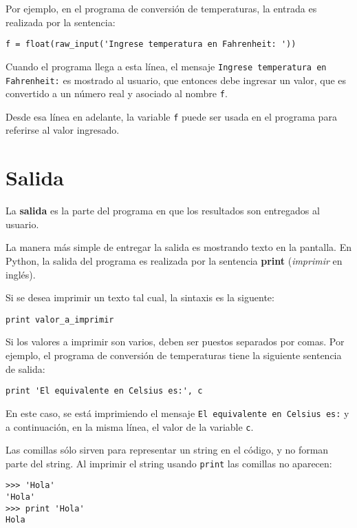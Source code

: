 Por ejemplo, en el programa de conversión de temperaturas, la entrada es
realizada por la sentencia:

\begin{lstlisting}
f = float(raw_input('Ingrese temperatura en Fahrenheit: '))
\end{lstlisting}

Cuando el programa llega a esta línea, el mensaje
\texttt{Ingrese temperatura en Fahrenheit:} es mostrado al usuario,
que entonces debe ingresar un valor, que es convertido a un número real
y asociado al nombre \lstinline!f!.

Desde esa línea en adelante, la variable \lstinline!f! puede ser usada
en el programa para referirse al valor ingresado.

\section{Salida}

La \textbf{salida} es la parte del programa en que los resultados son
entregados al usuario.

La manera más simple de entregar la salida es mostrando texto en la
pantalla. En Python, la salida del programa es realizada por la
sentencia \textbf{print} (\emph{imprimir} en inglés).

Si se desea imprimir un texto tal cual, la sintaxis es la siguente:

\begin{lstlisting}
print valor_a_imprimir
\end{lstlisting}

Si los valores a imprimir son varios, deben ser puestos separados por
comas. Por ejemplo, el programa de conversión de temperaturas tiene la
siguiente sentencia de salida:

\begin{lstlisting}
print 'El equivalente en Celsius es:', c
\end{lstlisting}

En este caso, se está imprimiendo el mensaje
\texttt{El equivalente en Celsius es:} y a continuación, en la misma
línea, el valor de la variable \lstinline!c!.

Las comillas sólo sirven para representar un string en el código, y no
forman parte del string. Al imprimir el string usando \lstinline!print!
las comillas no aparecen:

\begin{lstlisting}
>>> 'Hola'
'Hola'
>>> print 'Hola'
Hola
\end{lstlisting}

